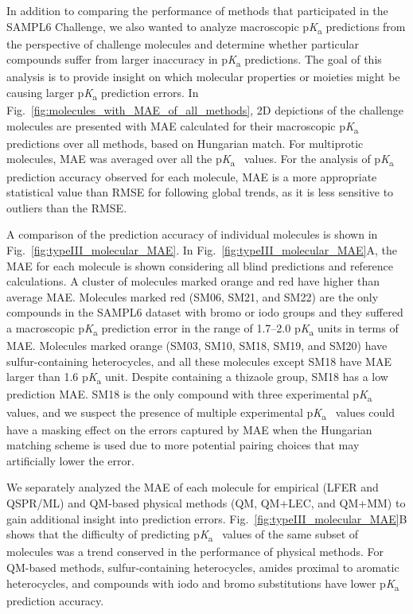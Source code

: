\documentclass[9pt,lineno,final]{elife}
\newcommand{\pKa}{p\textit{K}\textsubscript{a}}
\begin{document}
In addition to comparing the performance of methods that participated in the SAMPL6 Challenge, we also wanted to analyze macroscopic \pKa{} predictions from the perspective of challenge molecules and determine whether particular compounds suffer from larger inaccuracy in \pKa{} predictions. 
The goal of this analysis is to provide insight on which molecular properties or moieties might be causing larger \pKa{} prediction errors. 
In Fig.~\ref{fig:molecules_with_MAE_of_all_methods}, 2D depictions of the challenge molecules are presented with MAE calculated for their macroscopic \pKa{} predictions over all methods, based on Hungarian match. 
For multiprotic molecules, MAE was averaged over all the \pKa{}~ values. 
For the analysis of \pKa{} prediction accuracy observed for each molecule, MAE is a more appropriate statistical value than RMSE for following global trends, as it is less sensitive to outliers than the RMSE.

A comparison of the prediction accuracy of individual molecules is shown in Fig.~\ref{fig:typeIII_molecular_MAE}. 
In Fig.~\ref{fig:typeIII_molecular_MAE}A, the MAE for each molecule is shown considering all blind predictions and reference calculations. 
A cluster of molecules marked orange and red have higher than average MAE. 
Molecules marked red (SM06, SM21, and SM22) are the only compounds in the SAMPL6 dataset with bromo or iodo groups and they suffered a macroscopic \pKa{} prediction error in the range of 1.7--2.0 \pKa{} units in terms of MAE.
Molecules marked orange (SM03, SM10, SM18, SM19, and SM20) have sulfur-containing heterocycles, and all these molecules except SM18 have MAE larger than 1.6 \pKa{} unit.
Despite containing a thizaole group, SM18 has a low prediction MAE.
SM18 is the only compound with three experimental \pKa{}~ values, and we suspect the presence of multiple experimental \pKa{}~ values could have a masking effect on the errors captured by MAE when the Hungarian matching scheme is used due to more potential pairing choices that may artificially lower the error.

We separately analyzed the MAE of each molecule for empirical (LFER and QSPR/ML) and QM-based physical methods (QM, QM+LEC, and QM+MM) to gain additional insight into prediction errors. 
Fig.~\ref{fig:typeIII_molecular_MAE}B shows that the difficulty of predicting \pKa{}~ values of the same subset of molecules was a trend conserved in the performance of physical methods.
For QM-based methods, sulfur-containing heterocycles, amides proximal to aromatic heterocycles, and compounds with iodo and bromo substitutions have lower \pKa{} prediction accuracy.
\end{document}
